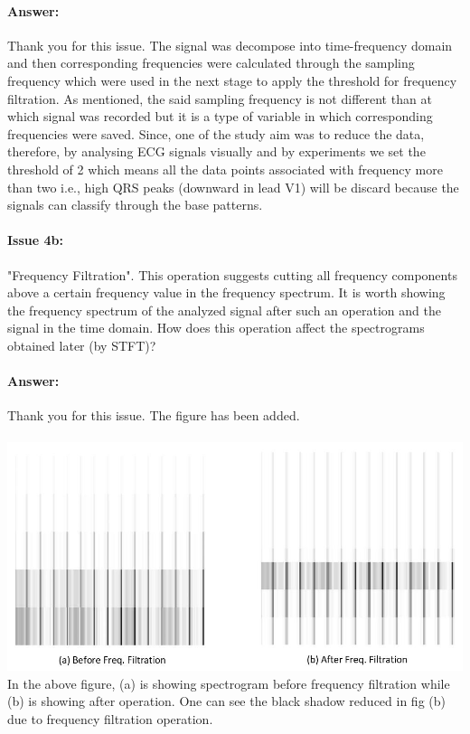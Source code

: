 \documentclass{article}
\begin{document}
\paragraph{Answer:}
Thank you for this issue. The signal was decompose into time-frequency domain and then corresponding frequencies were calculated through the sampling frequency  which were used in the next stage to apply the threshold for frequency filtration.  As mentioned, the said sampling frequency is not different than at which signal was recorded but it is a type of variable in which corresponding frequencies were saved. Since, one of the study aim was to reduce the data, therefore, by analysing ECG signals visually and by experiments we set the threshold of 2 which means all the data points associated with frequency more than two i.e., high QRS peaks (downward in lead V1) will be discard because the signals can classify through the base patterns.

\paragraph{Issue 4b:}
\begin{displayquote}
"Frequency Filtration". This operation suggests cutting all frequency components above a certain frequency value in the frequency spectrum. It is worth showing the frequency spectrum of the analyzed signal after such an operation and the signal in the time domain. How does this operation affect the spectrograms obtained later (by STFT)?
\end{displayquote}
\paragraph{Answer:}
Thank you for this issue. The figure has been added.\\\\
\includegraphics[scale=0.5]{before and after spectrogram.JPG}\\
In the above figure, (a) is showing spectrogram before frequency filtration while (b) is showing after operation. One can see the black shadow reduced in fig (b) due to frequency filtration operation. \\\\
\end{document}
